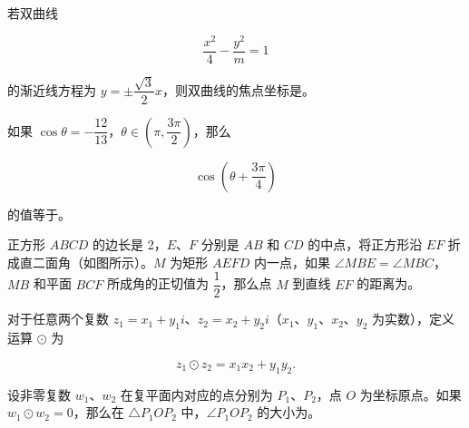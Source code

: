 \begin{question}
若双曲线

\nopagebreak[4]
\[
\frac{x^2}{4}-\frac{y^2}{m}=1
\]

的渐近线方程为 $y=\pm\dfrac{\sqrt3}{2}x$，则双曲线的焦点坐标是\gkblank{}。

\end{question}
\begin{question}
如果 $\cos\theta=-\dfrac{12}{13}$，$\theta\in\left(\pi,\dfrac{3\pi}{2}\right)$，那么

\nopagebreak[4]
\[
\cos\left(\theta+\frac{3\pi}{4}\right)
\]

的值等于\gkblank{}。

\Needspace{0.4\textheight}
\end{question}
\begin{question}
正方形 $ABCD$ 的边长是 2，$E\text{、}F$ 分别是 $AB$ 和 $CD$ 的中点，将正方形沿 $EF$ 折成直二面角（如图所示）。$M$ 为矩形 $AEFD$ 内一点，如果 $\angle MBE=\angle MBC$，$MB$ 和平面 $BCF$ 所成角的正切值为 $\dfrac12$，那么点 $M$ 到直线 $EF$ 的距离为\gkblank{}。
\nopagebreak[4]
\begin{center}\end{center}
\nopagebreak[4]
\end{question}
\begin{question}
对于任意两个复数 $z_1=x_1+y_1i$、$z_2=x_2+y_2i$（$x_1\text{、}y_1\text{、}x_2\text{、}y_2$ 为实数），定义运算 $\odot$ 为

\nopagebreak[4]
\[
z_1\odot z_2=x_1x_2+y_1y_2.
\]

设非零复数 $w_1\text{、}w_2$ 在复平面内对应的点分别为 $P_1\text{、}P_2$，点 $O$ 为坐标原点。如果 $w_1\odot w_2=0$，那么在 $\triangle P_1OP_2$ 中，$\angle P_1OP_2$ 的大小为\gkblank{}。

\end{question}

